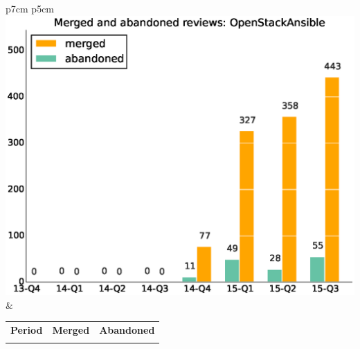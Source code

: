 \documentclass[a4wide,11pt]{article}
\begin{document}
\begin{tabular}{p{7cm} p{5cm}}
    \vspace{0pt} 
    \includegraphics[scale=.35]{figs/submitted_reviewsOpenStackAnsible.eps}
    & 
    \vspace{0pt}
    \begin{tabular}{l|r|r|}%
    \bfseries Period & \bfseries Merged & \bfseries Abandoned %
    \csvreader[head to column names]{data/submitted_reviewsOpenStackAnsible.csv}{}%
    {\\ & \merged & \abandoned}
    \end{tabular}
\end{tabular}



\end{document}
